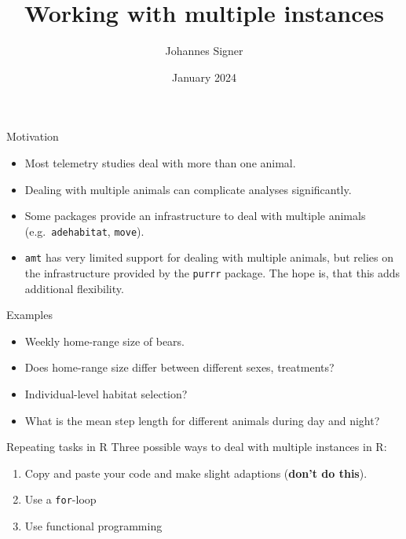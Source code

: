 \documentclass[ignorenonframetext,,t]{beamer}
\title{Working with multiple instances}
\author{Johannes Signer}
\date{January 2024}
\let\oldtextbf\textbf
\renewcommand{\textbf}[1]{\textcolor{spamwell}{\oldtextbf{#1}}}
\providecommand{\tightlist}{%
\setlength{\itemsep}{0pt}\setlength{\parskip}{0pt}}
\providecommand{\tightlist}{%
\setlength{\itemsep}{0pt}\setlength{\parskip}{0pt}}
\renewcommand{\tightlist}{\setlength{\itemsep}{1.4ex}\setlength{\parskip}{0pt}}
\begin{document}
\frame{\titlepage}



\begin{frame}[fragile]{Motivation}
\protect\hypertarget{motivation}{}
\begin{itemize}
\tightlist
\item
  Most telemetry studies deal with more than one animal.
\item
  Dealing with multiple animals can complicate analyses significantly.
\item
  Some packages provide an infrastructure to deal with multiple animals
  (e.g.~\texttt{adehabitat}, \texttt{move}).
\item
  \texttt{amt} has very limited support for dealing with multiple
  animals, but relies on the infrastructure provided by the
  \texttt{purrr} package. The hope is, that this adds additional
  flexibility.
\end{itemize}
\end{frame}

\begin{frame}{Examples}
\protect\hypertarget{examples}{}
\begin{itemize}
\tightlist
\item
  Weekly home-range size of bears.
\item
  Does home-range size differ between different sexes, treatments?
\item
  Individual-level habitat selection?
\item
  What is the mean step length for different animals during day and
  night?
\end{itemize}
\end{frame}

\begin{frame}[fragile]{Repeating tasks in R}
\protect\hypertarget{repeating-tasks-in-r}{}
Three possible ways to deal with multiple instances in R:

\begin{enumerate}
\tightlist
\item
  Copy and paste your code and make slight adaptions (\textbf{don't do
  this}).
\item
  Use a \texttt{for}-loop
\item
  Use functional programming
\end{enumerate}
\end{frame}
\end{document}
